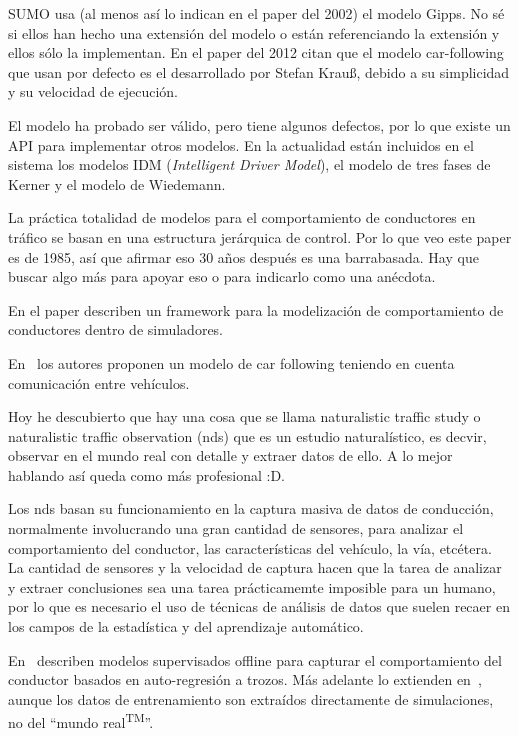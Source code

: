 SUMO usa (al menos así lo indican en el paper del 2002) el modelo Gipps\cite{krajzewicz2002sumo}. No sé si ellos han hecho una extensión del modelo o están referenciando la extensión y ellos sólo la implementan. En el paper del 2012 citan que el modelo car-following que usan por defecto es el desarrollado por Stefan Krauß\cite{jin2016evaluation}, debido a su simplicidad y su velocidad de ejecución.

El modelo ha probado ser válido, pero tiene algunos defectos, por lo que existe un API para implementar otros modelos. En la actualidad están incluidos en el sistema los modelos IDM\cite{treiber2000congested} (\textit{Intelligent Driver Model}), el modelo de tres fases de Kerner\cite{kerner2008testbed} y el modelo de Wiedemann\cite{wiedemann1974simulation}.

La práctica totalidad de modelos para el comportamiento de conductores en tráfico se basan en una estructura jerárquica de control\cite{michon1985critical}. Por lo que veo este paper es de 1985, así que afirmar eso 30 años después es una barrabasada. Hay que buscar algo más para apoyar eso o para indicarlo como una anécdota.

En el paper \cite{al2001framework} describen un framework para la modelización de comportamiento de conductores dentro de simuladores.

En~\cite{tang2014new} los autores proponen un modelo de car following teniendo en cuenta comunicación entre vehículos.

\TODO Hoy he descubierto que hay una cosa que se llama naturalistic traffic study o naturalistic traffic observation (\gls{nds}) que es un estudio naturalístico, es decvir, observar en el mundo real con detalle y extraer datos de ello. A lo mejor hablando así queda como más profesional :D.

Los \gls{nds} basan su funcionamiento en la captura masiva de datos de conducción, normalmente involucrando una gran cantidad de sensores, para analizar el comportamiento del conductor, las características del vehículo, la vía, etcétera. La cantidad de sensores y la velocidad de captura hacen que la tarea de analizar y extraer conclusiones  sea una tarea prácticamemte imposible para un humano, por lo que es necesario el uso de técnicas de análisis de datos que suelen recaer en los campos de la estadística y del aprendizaje automático.

En~\cite{sekizawa2007modeling} describen modelos supervisados offline para capturar el comportamiento del conductor basados en auto-regresión a trozos. Más adelante lo extienden en~\cite{terada2010multi}, aunque los datos de entrenamiento son extraídos directamente de simulaciones, no del \enquote{mundo real\textsuperscript{TM}}.

